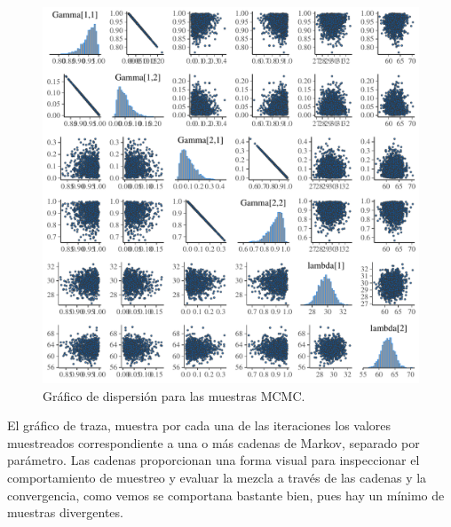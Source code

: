 \documentclass[a4paper]{article}\usepackage[]{graphicx}\usepackage[]{color}
\makeatletter
\def\maxwidth{ %
  \ifdim\Gin@nat@width>\linewidth
    \linewidth
  \else
    \Gin@nat@width
  \fi
}
\newenvironment{knitrout}{}{} %
\makeatother
\begin{document}
\begin{knitrout}
\color{fgcolor}\begin{figure}
\includegraphics[width=\maxwidth]{figure/unnamed-chunk-30-1} \caption[Gráfico de dispersión para las muestras MCMC]{Gráfico de dispersión para las muestras MCMC.}\label{fig:unnamed-chunk-30}
\end{figure}


\end{knitrout}

El gráfico de traza, muestra por cada una de las iteraciones los valores muestreados correspondiente a una o más cadenas de Markov, separado por parámetro. Las cadenas proporcionan una forma visual para inspeccionar el comportamiento de muestreo y evaluar la mezcla a través de las cadenas y la convergencia, como vemos se comportana bastante bien, pues hay un mínimo de muestras divergentes.
\end{document}
